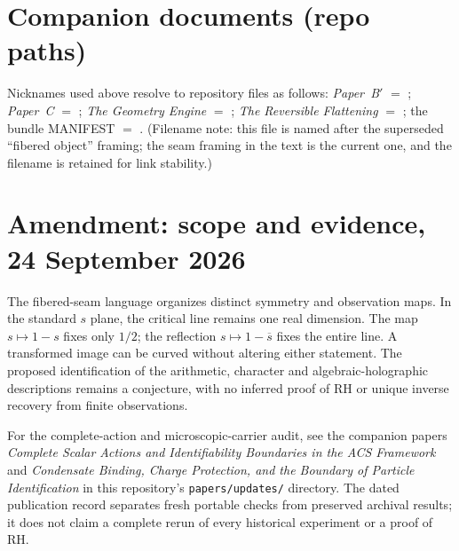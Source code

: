 \documentclass[11pt]{article}
\theoremstyle{definition}
\theoremstyle{plain}
\begin{document}
\section*{Companion documents (repo paths)}
Nicknames used above resolve to repository files as follows:
\emph{Paper~B$'$} $=$ ;
\emph{Paper~C} $=$ ;
\emph{The Geometry Engine} $=$ ;
\emph{The Reversible Flattening} $=$ ;
the bundle MANIFEST $=$ .
(Filename note: this file is named  after the
superseded ``fibered object'' framing; the seam framing in the text is the current one, and the
filename is retained for link stability.)


\section*{Amendment: scope and evidence, 24 September 2026}
The fibered-seam language organizes distinct symmetry and observation maps. In the standard $s$ plane, the critical line remains one real dimension. The map $s\mapsto1-s$ fixes only $1/2$; the reflection $s\mapsto1-\overline{s}$ fixes the entire line. A transformed image can be curved without altering either statement. The proposed identification of the arithmetic, character and algebraic-holographic descriptions remains a conjecture, with no inferred proof of RH or unique inverse recovery from finite observations.

For the complete-action and microscopic-carrier audit, see the companion
papers \emph{Complete Scalar Actions and Identifiability Boundaries in the ACS
Framework} and \emph{Condensate Binding, Charge Protection, and the Boundary
of Particle Identification} in this repository's \texttt{papers/updates/}
directory. The dated publication record separates fresh portable checks
from preserved archival results; it does not claim a complete rerun of every
historical experiment or a proof of RH.
\end{document}
